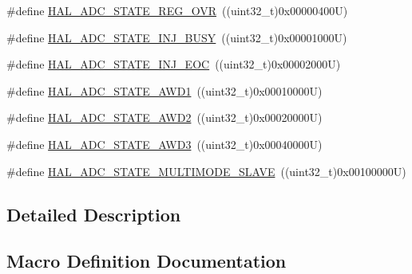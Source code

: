 \begin{DoxyCompactItemize}
\item 
\#define \mbox{\hyperlink{group___a_d_c___exported___types_ga1f99cd51b6636d9f60bc68dacb01eb10}{H\+A\+L\+\_\+\+A\+D\+C\+\_\+\+S\+T\+A\+T\+E\+\_\+\+R\+E\+G\+\_\+\+O\+VR}}~((uint32\+\_\+t)0x00000400\+U)
\item 
\#define \mbox{\hyperlink{group___a_d_c___exported___types_ga0044d240de80a70923b5c970d19ba24b}{H\+A\+L\+\_\+\+A\+D\+C\+\_\+\+S\+T\+A\+T\+E\+\_\+\+I\+N\+J\+\_\+\+B\+U\+SY}}~((uint32\+\_\+t)0x00001000\+U)
\item 
\#define \mbox{\hyperlink{group___a_d_c___exported___types_gafcfffd11ab8b84d3b0a1ce50ccf821d5}{H\+A\+L\+\_\+\+A\+D\+C\+\_\+\+S\+T\+A\+T\+E\+\_\+\+I\+N\+J\+\_\+\+E\+OC}}~((uint32\+\_\+t)0x00002000\+U)
\item 
\#define \mbox{\hyperlink{group___a_d_c___exported___types_ga39ce295171a5e608097017fda4cfd7d5}{H\+A\+L\+\_\+\+A\+D\+C\+\_\+\+S\+T\+A\+T\+E\+\_\+\+A\+W\+D1}}~((uint32\+\_\+t)0x00010000\+U)
\item 
\#define \mbox{\hyperlink{group___a_d_c___exported___types_gae6e9712c706ca7f2998dfb5cf776b48f}{H\+A\+L\+\_\+\+A\+D\+C\+\_\+\+S\+T\+A\+T\+E\+\_\+\+A\+W\+D2}}~((uint32\+\_\+t)0x00020000\+U)
\item 
\#define \mbox{\hyperlink{group___a_d_c___exported___types_gaa43e91fedb9ce41e36bc78ced4f3912e}{H\+A\+L\+\_\+\+A\+D\+C\+\_\+\+S\+T\+A\+T\+E\+\_\+\+A\+W\+D3}}~((uint32\+\_\+t)0x00040000\+U)
\item 
\#define \mbox{\hyperlink{group___a_d_c___exported___types_ga24f867061abe6ee31227ec21289c69db}{H\+A\+L\+\_\+\+A\+D\+C\+\_\+\+S\+T\+A\+T\+E\+\_\+\+M\+U\+L\+T\+I\+M\+O\+D\+E\+\_\+\+S\+L\+A\+VE}}~((uint32\+\_\+t)0x00100000\+U)
\end{DoxyCompactItemize}


\subsection{Detailed Description}


\subsection{Macro Definition Documentation}
\mbox{\label{group___a_d_c___exported___types_ga39ce295171a5e608097017fda4cfd7d5}} 
